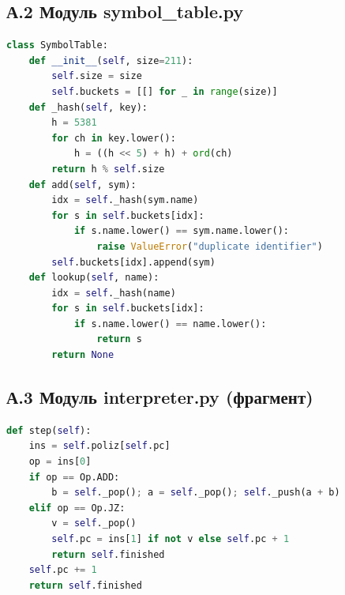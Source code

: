 \documentclass[14pt,a4paper]{article}
\begin{document}
\subsection*{А.2 Модуль symbol\_table.py}
\begin{lstlisting}[language=Python]
class SymbolTable:
    def __init__(self, size=211):
        self.size = size
        self.buckets = [[] for _ in range(size)]
    def _hash(self, key):
        h = 5381
        for ch in key.lower():
            h = ((h << 5) + h) + ord(ch)
        return h % self.size
    def add(self, sym):
        idx = self._hash(sym.name)
        for s in self.buckets[idx]:
            if s.name.lower() == sym.name.lower():
                raise ValueError("duplicate identifier")
        self.buckets[idx].append(sym)
    def lookup(self, name):
        idx = self._hash(name)
        for s in self.buckets[idx]:
            if s.name.lower() == name.lower():
                return s
        return None
\end{lstlisting}

\subsection*{А.3 Модуль interpreter.py (фрагмент)}
\begin{lstlisting}[language=Python]
def step(self):
    ins = self.poliz[self.pc]
    op = ins[0]
    if op == Op.ADD:
        b = self._pop(); a = self._pop(); self._push(a + b)
    elif op == Op.JZ:
        v = self._pop()
        self.pc = ins[1] if not v else self.pc + 1
        return self.finished
    self.pc += 1
    return self.finished
\end{lstlisting}
\end{document}
